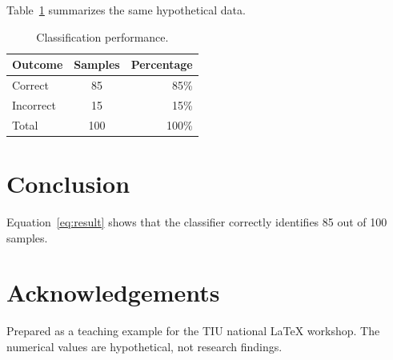 \documentclass[11pt,a4paper]{article}
\begin{document}
Table~\ref{tab:results} summarizes the same hypothetical data.
\begin{table}[htbp]
  \centering
  \caption{Classification performance.}
  \label{tab:results}
  \begin{tabular}{|l|c|r|}
    \hline
    Outcome & Samples & Percentage \\
    \hline
    Correct & 85 & 85\% \\
    Incorrect & 15 & 15\% \\
    Total & 100 & 100\% \\
    \hline
  \end{tabular}
\end{table}

\section{Conclusion}
Equation~\eqref{eq:result} shows that the classifier correctly identifies 85 out of 100 samples.
\section*{Acknowledgements}
Prepared as a teaching example for the TIU national LaTeX workshop. The numerical values are hypothetical, not research findings.


\end{document}
